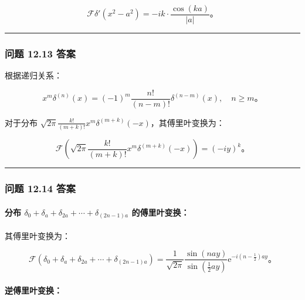 \[
\mathcal{F}\delta'(x^2-a^2) = -i k \cdot \frac{\cos(k a)}{|a|}。
\]

\begin{center}\rule{0.5\linewidth}{0.5pt}\end{center}

\subsubsection{问题 12.13 答案}\label{ux95eeux9898-12.13-ux7b54ux6848}

根据递归关系：

\[
x^m \delta^{(n)}(x) = (-1)^m \frac{n!}{(n-m)!} \delta^{(n-m)}(x), \quad n \geq m。
\]

对于分布
\(\sqrt{2 \pi} \frac{k!}{(m+k)!} x^m \delta^{(m+k)}(-x)\)，其傅里叶变换为：

\[
\mathcal{F}\left(\sqrt{2 \pi} \frac{k!}{(m+k)!} x^m \delta^{(m+k)}(-x)\right) = (-i y)^k。
\]

\begin{center}\rule{0.5\linewidth}{0.5pt}\end{center}

\subsubsection{问题 12.14 答案}\label{ux95eeux9898-12.14-ux7b54ux6848}

\paragraph{\texorpdfstring{分布
\(\delta_{0} + \delta_{a} + \delta_{2a} + \cdots + \delta_{(2n-1)a}\)
的傅里叶变换：}{分布 \textbackslash delta\_\{0\} + \textbackslash delta\_\{a\} + \textbackslash delta\_\{2a\} + \textbackslash cdots + \textbackslash delta\_\{(2n-1)a\} 的傅里叶变换：}}\label{ux5206ux5e03-delta_0-delta_a-delta_2a-cdots-delta_2n-1a-ux7684ux5085ux91ccux53f6ux53d8ux6362}

其傅里叶变换为：

\[
\mathcal{F}\left(\delta_{0} + \delta_{a} + \delta_{2a} + \cdots + \delta_{(2n-1)a}\right) = \frac{1}{\sqrt{2 \pi}} \frac{\sin(n a y)}{\sin(\frac{1}{2} a y)} \mathrm{e}^{-i(n-\frac{1}{2}) a y}。
\]

\paragraph{逆傅里叶变换：}\label{ux9006ux5085ux91ccux53f6ux53d8ux6362}

